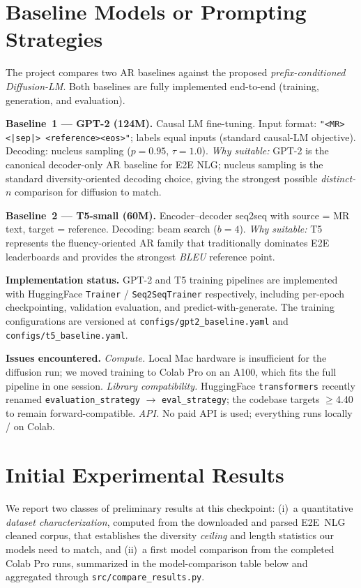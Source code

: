 \documentclass[11pt,a4paper]{article}
\begin{document}
\section{Baseline Models or Prompting Strategies}

The project compares two AR baselines against the proposed
\emph{prefix-conditioned Diffusion-LM}. Both baselines are fully implemented
end-to-end (training, generation, and evaluation).

\textbf{Baseline~1 --- GPT-2 (124M).}
Causal LM fine-tuning. Input format: \texttt{"<MR> <|sep|> <reference><eos>"};
labels equal inputs (standard causal-LM objective). Decoding: nucleus sampling
($p\!=\!0.95$, $\tau\!=\!1.0$). \emph{Why suitable:} GPT-2 is the canonical
decoder-only AR baseline for E2E NLG; nucleus sampling is the standard
diversity-oriented decoding choice, giving the strongest possible
\emph{distinct-$n$} comparison for diffusion to match.

\textbf{Baseline~2 --- T5-small (60M).}
Encoder--decoder seq2seq with source = MR text, target = reference.
Decoding: beam search ($b\!=\!4$). \emph{Why suitable:} T5 represents the
fluency-oriented AR family that traditionally dominates E2E leaderboards and
provides the strongest \emph{BLEU} reference point.

\textbf{Implementation status.}
GPT-2 and T5 training pipelines are implemented with HuggingFace
\texttt{Trainer} / \texttt{Seq2SeqTrainer} respectively, including per-epoch
checkpointing, validation evaluation, and predict-with-generate. The training
configurations are versioned at \texttt{configs/gpt2\_baseline.yaml} and
\texttt{configs/t5\_baseline.yaml}.

\textbf{Issues encountered.}
\emph{Compute.} Local Mac hardware is insufficient for the diffusion run; we
moved training to Colab Pro on an A100, which fits the full pipeline in one
session. \emph{Library compatibility.} HuggingFace \texttt{transformers}
recently renamed \texttt{evaluation\_strategy} $\rightarrow$ \texttt{eval\_strategy};
the codebase targets $\geq$4.40 to remain forward-compatible.
\emph{API.} No paid API is used; everything runs locally / on Colab.

\section{Initial Experimental Results}

We report two classes of preliminary results at this checkpoint:
(i)~a quantitative \emph{dataset characterization}, computed from the
downloaded and parsed E2E~NLG cleaned corpus, that establishes the
diversity \emph{ceiling} and length statistics our models need to match,
and (ii)~a first model comparison from the completed Colab Pro runs,
summarized in the model-comparison table below and aggregated through
\texttt{src/compare\_results.py}.
\end{document}
